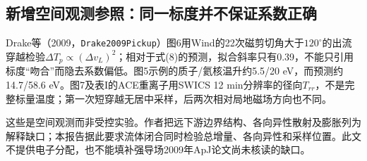 \subsection{新增空间观测参照：同一标度并不保证系数正确}
Drake等（2009，\texttt{Drake2009Pickup}）图6用Wind的22次磁剪切角大于$120^\circ$的出流穿越检验$\Delta T_p\propto(\Delta v_L)^2$；相对于式(8)的预测，拟合斜率只有0.39，不能只引用标度“吻合”而隐去系数偏低。图5示例的质子/氦核温升约5.5/20 eV，而预测约14.7/58.6 eV。图7及表I的ACE重离子用SWICS 12 min分辨率的径向$T_{rr}$，不是完整标量温度；第一次短穿越无居中采样，后两次相对局地磁场方向也不同。\citep{Drake2009Pickup}

这些是空间观测而非受控实验。作者把远下游边界结构、各向异性散射及膨胀列为解释缺口；本报告据此要求流体闭合同时检验总增量、各向异性和采样位置。此文不提供电子分配，也不能填补强导场2009年ApJ论文尚未核读的缺口。
